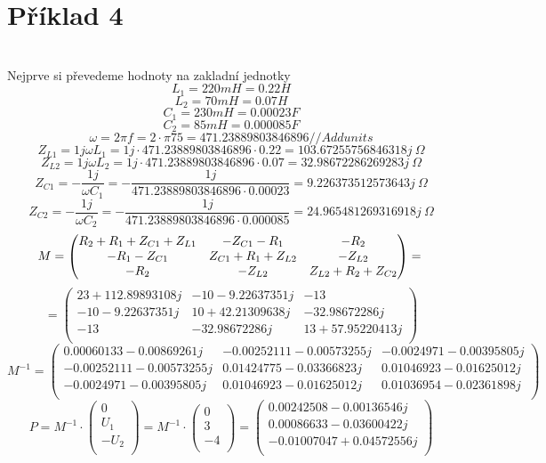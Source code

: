 \section{Příklad 4}
\\
Nejprve si převedeme hodnoty na zakladní jednotky\\
\[
  L_1 = 220 mH = 0.22 H
\]
\[
  L_2 = 70 mH = 0.07 H
\]
\[
  C_1 = 230 mH = 0.00023 F
\]
\[
  C_2 = 85 mH = 0.000085 F
\]
\[
  \omega = 2\pi f 
  = 2 \cdot \pi 75
  = 471.23889803846896 // Add units 
\]
\[
  Z_{L1} = 1j \omega L_1
  = 1j \cdot 471.23889803846896 \cdot 0.22 
  = 103.67255756846318j\ \Omega
\]
\[
  Z_{L2} = 1j \omega L_2
  = 1j \cdot 471.23889803846896 \cdot 0.07 
  = 32.98672286269283j \ \Omega
\]
\[
  Z_{C1} = -\displaystyle\frac{1j}{\omega C_1}
  = - \displaystyle\frac{1j}{471.23889803846896 \cdot 0.00023}
  = 9.226373512573643j\ \Omega
\]
\[
  Z_{C2} = -\displaystyle\frac{1j}{\omega C_2}
  = - \displaystyle\frac{1j}{471.23889803846896 \cdot 0.000085}
  = 24.965481269316918j\ \Omega
\]
\[
  M =
  \begin{pmatrix}
    R_2+R_1+Z_{C1}+Z_{L1} & -Z_{C1}-R_1 & -R_2\\
    -R_1-Z_{C1} & Z_{C1}+R_1+Z_{L2} & -Z_{L2}\\
    -R_2 & -Z_{L2} & Z_{L2}+R_2+Z_{C2}\\
  \end{pmatrix}
  =\\
\]
\[
  =
  \begin{pmatrix}
    23+112.89893108j & -10 -9.22637351j & -13\\
    -10 -9.22637351j & 10 +42.21309638j & -32.98672286j\\
    -13 & -32.98672286j & 13 +57.95220413j\\
  \end{pmatrix}
\]
\[
  M^{-1}
  =
  \begin{pmatrix}
    0.00060133-0.00869261j & -0.00252111-0.00573255j & -0.0024971 -0.00395805j\\
    -0.00252111-0.00573255j & 0.01424775-0.03366823j & 0.01046923-0.01625012j\\
    -0.0024971 -0.00395805j & 0.01046923-0.01625012j & 0.01036954-0.02361898j\\
  \end{pmatrix}
\]
\[
P = M^{-1} \cdot 
\begin{pmatrix}
  0\\
  U_1\\
  -U_2\\
\end{pmatrix}
= M^{-1}\cdot
\begin{pmatrix}
  0\\
  3\\
  -4\\
\end{pmatrix}
= 
\begin{pmatrix}
  0.00242508 -0.00136546j\\
  0.00086633 -0.03600422j\\
  -0.01007047 +0.04572556j\\
\end{pmatrix}
\]
